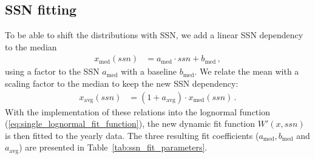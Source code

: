 \subsection{SSN fitting}
\label{sec:ssn_fitting}
To be able to shift the distributions with SSN, we add a linear SSN dependency to the median
\begin{align}
	x_\text{med}(ssn) &= a_\text{med} \cdot ssn + b_\text{med}\,,	\label{eq:median_with_ssn}
\end{align}
using a factor to the SSN $a_\text{med}$ with a baseline $b_\text{med}$. We relate the mean with a scaling factor to the median to keep the new SSN dependency:
\begin{align}
	x_\text{avg}(ssn) &= (1 + a_\text{avg}) \cdot x_\text{med}(ssn)\,.	\label{eq:mean_with_ssn}
\end{align}
With the implementation of these relations into the lognormal function (\ref{eq:single_lognormal_fit_function}), the new dynamic fit function $W'(x,ssn)$ is then fitted to the yearly data. The three resulting fit coefficients ($a_\text{med}, b_\text{med}$ and $a_\text{avg}$) are presented in Table~\ref{tab:ssn_fit_parameters}.\\
